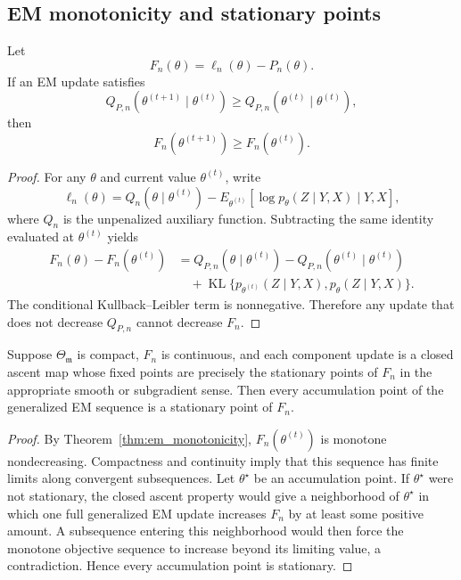 \subsection{EM monotonicity and stationary points}

\begin{theorem}
\label{thm:em_monotonicity}
Let
\[
    F_n(\theta)=\ell_n(\theta)-P_n(\theta).
\]
If an EM update satisfies
\[
    Q_{P,n}(\theta^{(t+1)}\mid\theta^{(t)})
    \ge
    Q_{P,n}(\theta^{(t)}\mid\theta^{(t)}),
\]
then
\[
    F_n(\theta^{(t+1)})\ge F_n(\theta^{(t)}).
\]
\end{theorem}

\begin{proof}
For any \(\theta\) and current value \(\theta^{(t)}\), write
\[
    \ell_n(\theta)
    =
    Q_n(\theta\mid\theta^{(t)})
    -
    E_{\theta^{(t)}}
    \left[
        \log p_\theta(Z\mid Y,X)
        \mid Y,X
    \right],
\]
where \(Q_n\) is the unpenalized auxiliary function.  Subtracting the same
identity evaluated at \(\theta^{(t)}\) yields
\[
    \begin{aligned}
    F_n(\theta)-F_n(\theta^{(t)})
    &=
    Q_{P,n}(\theta\mid\theta^{(t)})
    -
    Q_{P,n}(\theta^{(t)}\mid\theta^{(t)}) \\
    &\quad+
    \operatorname{KL}\{
    p_{\theta^{(t)}}(Z\mid Y,X),
    p_\theta(Z\mid Y,X)
    \}.
    \end{aligned}
\]
The conditional Kullback--Leibler term is nonnegative.  Therefore any update
that does not decrease \(Q_{P,n}\) cannot decrease \(F_n\).
\end{proof}

\begin{proposition}
\label{prop:gem_stationary}
Suppose \(\Theta_{\mathfrak m}\) is compact, \(F_n\) is continuous, and each
component update is a closed ascent map whose fixed points are precisely the
stationary points of \(F_n\) in the appropriate smooth or subgradient sense.
Then every accumulation point of the generalized EM sequence is a stationary
point of \(F_n\).
\end{proposition}

\begin{proof}
By Theorem~\ref{thm:em_monotonicity}, \(F_n(\theta^{(t)})\) is monotone
nondecreasing.  Compactness and continuity imply that this sequence has finite
limits along convergent subsequences.  Let \(\theta^\star\) be an accumulation
point.  If \(\theta^\star\) were not stationary, the closed ascent property
would give a neighborhood of \(\theta^\star\) in which one full generalized EM
update increases \(F_n\) by at least some positive amount.  A subsequence
entering this neighborhood would then force the monotone objective sequence to
increase beyond its limiting value, a contradiction.  Hence every accumulation
point is stationary.
\end{proof}

